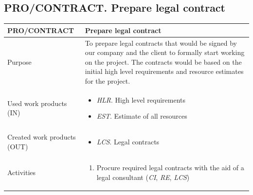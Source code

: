 \subsection{PRO/CONTRACT. Prepare legal contract } %
\begin{table}[h!]
\begin{tabular}{l|p{}}
\hline
\textbf{PRO/CONTRACT}        & \textbf{Prepare legal contract} \\ \hline

Purpose & To prepare legal contracts that would be signed by our company and the client to formally start working on the project. The contracts would be based on the initial high level requirements and resource estimates for the project. \\ \hline
Used work products (IN)   &      
\begin{itemize}
    \item \textit{HLR}. High level requirements 
    \item \textit{EST}. Estimate of all resources
\end{itemize}
\\ \hline
Created work products (OUT) &     
\begin{itemize}
    \item \textit{LCS}. Legal contracts
\end{itemize}
\\ \hline
Activities            &   
\begin{enumerate}
    \item Procure required legal contracts with the aid of a legal consultant (\textit{CI}, \textit{RE}, \textit{LCS})
\end{enumerate}
\\ \hline
\end{tabular}

\label{pro/sign}
\end{table}

\newpage
